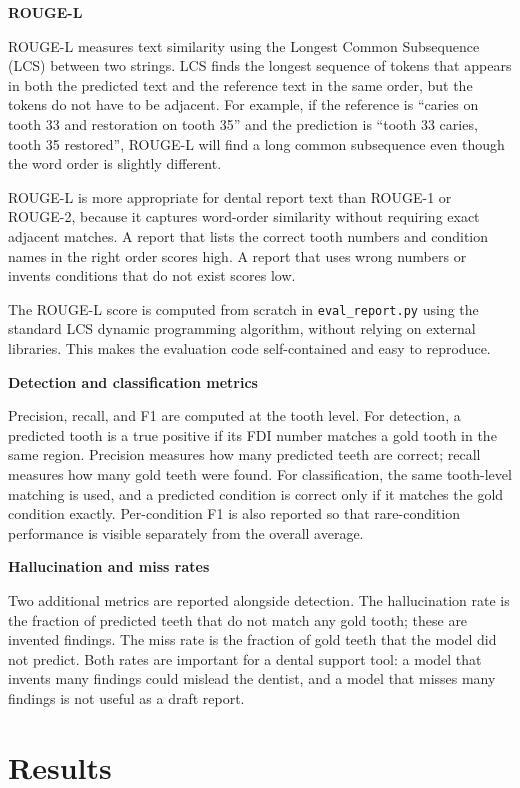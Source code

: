 \documentclass[a4paper,12pt]{report}
\newcommand{\minisection}[1]{%
  \vspace{1ex}
  \noindent\textbf{#1}\par
  \vspace{0.5ex}
}
\begin{document}
\minisection{ROUGE-L}

ROUGE-L measures text similarity using the Longest Common Subsequence (LCS) between two strings. LCS finds the longest sequence of tokens that appears in both the predicted text and the reference text in the same order, but the tokens do not have to be adjacent. For example, if the reference is ``caries on tooth 33 and restoration on tooth 35'' and the prediction is ``tooth 33 caries, tooth 35 restored'', ROUGE-L will find a long common subsequence even though the word order is slightly different.

ROUGE-L is more appropriate for dental report text than ROUGE-1 or ROUGE-2, because it captures word-order similarity without requiring exact adjacent matches. A report that lists the correct tooth numbers and condition names in the right order scores high. A report that uses wrong numbers or invents conditions that do not exist scores low.

The ROUGE-L score is computed from scratch in \texttt{eval\_report.py} using the standard LCS dynamic programming algorithm, without relying on external libraries. This makes the evaluation code self-contained and easy to reproduce.

\minisection{Detection and classification metrics}

Precision, recall, and F1 are computed at the tooth level. For detection, a predicted tooth is a true positive if its FDI number matches a gold tooth in the same region. Precision measures how many predicted teeth are correct; recall measures how many gold teeth were found. For classification, the same tooth-level matching is used, and a predicted condition is correct only if it matches the gold condition exactly. Per-condition F1 is also reported so that rare-condition performance is visible separately from the overall average.

\minisection{Hallucination and miss rates}

Two additional metrics are reported alongside detection. The hallucination rate is the fraction of predicted teeth that do not match any gold tooth; these are invented findings. The miss rate is the fraction of gold teeth that the model did not predict. Both rates are important for a dental support tool: a model that invents many findings could mislead the dentist, and a model that misses many findings is not useful as a draft report.

\chapter{Results}
\end{document}
